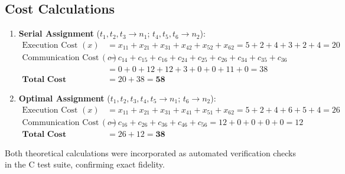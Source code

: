 \documentclass[12pt]{article}
\begin{document}
\subsection{Cost Calculations}
\begin{enumerate}
    \item \textbf{Serial Assignment} ($t_1, t_2, t_3 \to n_1$; $t_4, t_5, t_6 \to n_2$):
    \begin{align*}
    \text{Execution Cost } (x) &= x_{11} + x_{21} + x_{31} + x_{42} + x_{52} + x_{62} = 5 + 2 + 4 + 3 + 2 + 4 = 20 \\
    \text{Communication Cost } (c) &= c_{14} + c_{15} + c_{16} + c_{24} + c_{25} + c_{26} + c_{34} + c_{35} + c_{36} \\
    &= 0 + 0 + 12 + 12 + 3 + 0 + 0 + 11 + 0 = 38 \\
    \textbf{Total Cost} &= 20 + 38 = \mathbf{58}
    \end{align*}

    \item \textbf{Optimal Assignment} ($t_1, t_2, t_3, t_4, t_5 \to n_1$; $t_6 \to n_2$):
    \begin{align*}
    \text{Execution Cost } (x) &= x_{11} + x_{21} + x_{31} + x_{41} + x_{51} + x_{62} = 5 + 2 + 4 + 6 + 5 + 4 = 26 \\
    \text{Communication Cost } (c) &= c_{16} + c_{26} + c_{36} + c_{46} + c_{56} = 12 + 0 + 0 + 0 + 0 = 12 \\
    \textbf{Total Cost} &= 26 + 12 = \mathbf{38}
    \end{align*}
\end{enumerate}

Both theoretical calculations were incorporated as automated verification checks in the C test suite, confirming exact fidelity.
\end{document}
